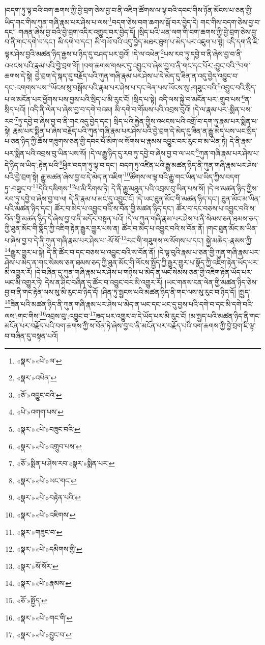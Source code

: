 །བདག་ཏུ་ལྟ་བའི་བག་ཆགས་ཀྱི་བྱེ་བྲག་ཅེས་བྱ་བ་ནི་འཇིག་ཚོགས་ལ་ལྟ་བའི་དབང་གིས་ཉོན་མོངས་པ་ཅན་གྱི་ཡིད་གང་གིས་ཀུན་གཞི་རྣམ་པར་ཤེས་པ་ལས་\footnote{«སྣར་»«པེ་»ལ་}བདག་ཅེས་བག་ཆགས་སྒོ་བར་བྱེད་དེ། གང་གིས་བདག་ཅེས་བྱ་བ་དང་། གཞན་ཞེས་བྱ་བའི་བྱེ་བྲག་འདིར་འགྱུར་བར་བྱེད་དོ། །སྲིད་པའི་ཡན་ལག་གི་བག་ཆགས་ཀྱི་བྱེ་བྲག་ཅེས་བྱ་བ་ནི་གང་དགེ་བ་དང་། མི་དགེ་བ་དང་། མི་གཡོ་བའི་འདུ་བྱེད་མཐར་ཐུག་པ་མེད་པར་འཇུག་པ་སྟེ། འདི་དག་ནི་ཇི་ལྟར་ཤེས་བྱའི་མཚན་ཉིད་རྒྱས་པ་ཉིད་དུ་བཤད་པར་བྱའོ། །དེ་ལ་འཕེན་\footnote{«སྣར་»འཔེན་}པས་རབ་ཏུ་དབྱེ་བ་ནི་ཞེས་བྱ་བ་ནི་འཕངས་པའི་རྣམ་པའི་བྱེ་བྲག་གོ། །བག་ཆགས་གསར་དུ་འབྱུང་བ་ཞེས་བྱ་བ་ནི་གང་དང་པོར་:བྱུང་བའི་\footnote{«ཅོ་»འབྱུང་བའི་}བག་ཆགས་དེ་སྟེ། བྱེ་བྲག་དེ་སྐད་དུ་བརྗོད་པའི་ཀུན་གཞི་རྣམ་པར་ཤེས་པ་དེ་མེད་དུ་ཟིན་ན་འདུ་བྱེད་འབྱུང་བ་དང་:འགགས་པས་\footnote{«པེ་»འགག་པས་}ཡོངས་སུ་བསྒོས་པའི་རྣམ་པར་ཤེས་པ་དང་ལེན་པས་ཡོངས་སུ་:གཟུང་བའི་\footnote{«སྣར་»«པེ་»བཟུང་བའི་}འབྱུང་བའི་སྲིད་པ་ལ་མངོན་པར་ཕྱོགས་པས་བྱས་པའི་སྲིད་པ་མི་རུང་ངོ། །སྲིད་པ་སྟེ། འདི་ལས་སྐྱེ་བ་མངོན་པར་:གྲུབ་པས་\footnote{«སྣར་»«པེ་»འགྲུབ་པས་}ན་སྲིད་པའོ། །འདི་ནི་ལེན་པ་ཞེས་བྱ་བ་དགེ་བའམ། མི་དགེ་བ་གོམས་པའི་འབྲས་བུའོ། །དེ་ལ་རྣམ་པར་:སྨིན་པས་རབ་\footnote{«ཅོ་»སྨིན་པ་ཤེས་རབ་«སྣར་»སྨིན་པར་}ཏུ་དབྱེ་བ་ཞེས་བྱ་བ་ནི་གང་འདུ་བྱེད་དང་། སྲིད་པའི་རྐྱེན་གྱིས་འཕངས་པའི་འགྲོ་བ་དག་ཏུ་རྣམ་པར་སྨིན་པ་སྟེ། རྣམ་པར་སྨིན་པ་ཞེས་བརྗོད་པའི་ཀུན་གཞི་རྣམ་པར་ཤེས་པའི་བྱེ་བྲག་དེ་མེད་དུ་ཟིན་ན་རྒྱུ་མེད་པས་ཡང་སྲིད་པ་ཅན་ཉིད་ཀྱི་ཆོས་གཟུགས་ཅན་གྱི་དབང་པོ་མིག་ལ་སོགས་པ་རྣམས་འབྱུང་བར་རུང་བ་མ་ཡིན་ཏེ། དེ་ནི་རྣམ་པར་སྨིན་པའི་འབྲས་བུ་ཡིན་པས་སོ། །དེ་ལ་རྒྱུ་ཉིད་དུ་རབ་ཏུ་དབྱེ་བ་ཞེས་བྱ་བ་ལ་ཡང་\footnote{«སྣར་»«པེ་»ཡང་གང་}ཀུན་གཞི་རྣམ་པར་ཤེས་པ་དེ་ཉིད་ལ་ཡིད་:རྟེན་པའི་\footnote{«སྣར་»«པེ་»བརྟེན་པའི་}ཕྱིར་བདག་ཏུ་ལྟ་བ་དང་། བདག་ཏུ་འཛིན་པའི་རྒྱུ་མཚན་ཉིད་ནི་ཀུན་གཞི་རྣམ་པར་ཤེས་པའི་བྱེ་བྲག་སྟེ། རྒྱུ་མཚན་ཞེས་བྱ་བ་དེ་མེད་ན་འཇིག་\footnote{«སྣར་»«པེ་»འཇིགས་}ཚོགས་ལ་ལྟ་བའི་རྒྱུ་གང་ཡིན་པ་ཡིད་ཀྱིས་བདག་ཏུ་:བཟུང་བ་\footnote{«སྣར་»གཟུང་བ་}དེའི་དམིགས་\footnote{«སྣར་»«པེ་»དམིགས་གྱི་}པ་མི་རིགས་ཏེ། དེ་ནི་རྒྱུ་མཐུན་པའི་འབྲས་བུ་ཡིན་པས་སོ། །དེ་ལ་མཚན་ཉིད་ཀྱིས་རབ་ཏུ་དབྱེ་བ་ཞེས་བྱ་བ་ལ། དེ་ནི་རྣམ་པ་མང་དུ་འབྱུང་ངོ། །དེ་ཡང་ཐུན་མོང་གི་མཚན་ཉིད་དང་། ཐུན་མོང་མ་ཡིན་པའི་མཚན་ཉིད་དང་། ཚོར་བ་མེད་པ་འབྱུང་བའི་ས་བོན་གྱི་མཚན་ཉིད་དང་། ཚོར་བ་དང་བཅས་པ་འབྱུང་བའི་ས་བོན་གྱི་མཚན་ཉིད་དེ་ཞེས་བྱ་བ་ནི་མདོར་བསྟན་པའོ། །དེ་ལ་ཀུན་གཞི་རྣམ་པར་ཤེས་པ་ནི་སེམས་ཅན་ཐམས་ཅད་ཀྱི་ཐུན་མོང་གི་སྣོད་ཀྱི་འཇིག་རྟེན་རྒྱུར་གྱུར་པས་ན། ཚོར་བ་མེད་པ་འབྱུང་བའི་ས་བོན་ནོ། །གང་ཐུན་མོང་མ་ཡིན་པ་ཞེས་བྱ་བ་དེ་ནི་ཀུན་གཞི་རྣམ་པར་ཤེས་པ་:སོ་སོ་\footnote{«སྣར་»སོ་སོར་}རང་གི་གཟུགས་ལ་སོགས་པ་དང་། སྐྱེ་མཆེད་:རྣམས་ཀྱི་\footnote{«སྣར་»«པེ་»རྣམས་}རྒྱུར་གྱུར་པ་སྟེ། དེ་ནི་ཚོར་བ་དང་བཅས་པ་འབྱུང་བའི་ས་བོན་ནོ། །དེ་ལྟ་བུའི་རྣམ་པ་ཅན་གྱི་ཀུན་གཞི་རྣམ་པར་ཤེས་པ་མེད་ན་གང་སེམས་ཅན་ཐམས་ཅད་ཀྱི་ཐུན་མོང་གི་ལོངས་སྤྱོད་ཀྱི་རྒྱུར་གྱུར་པ་སྣོད་ཀྱི་འཇིག་རྟེན་ཡོད་པར་མི་འགྱུར་རོ། །དེ་བཞིན་དུ་ཀུན་གཞི་རྣམ་པར་ཤེས་པ་གཉིས་པ་མེད་ན་ཡང་སེམས་ཅན་གྱི་འཇིག་རྟེན་ཡོད་པར་ཡང་མི་འགྱུར་ཏེ། དེས་ན་ཤིང་བཞིན་དུ་ཚོར་བ་འབྱུང་བར་མི་འགྱུར་རོ། །ཡང་གནས་ངན་ལེན་གྱི་མཚན་ཉིད་ཅེས་བྱ་བ་ནི་གང་རྟེན་ལས་སུ་མི་རུང་བ་ཉིད་དོ། །ཤིན་ཏུ་སྦྱངས་པའི་མཚན་ཉིད་ནི་གང་ལས་སུ་རུང་བ་ཉིད་དོ། །སྤྱད་\footnote{«ཅོ་»སྤྱོད་}ཟིན་པའི་མཚན་ཉིད་ནི་ཀུན་གཞི་རྣམ་པར་ཤེས་པ་མེད་ན་ཡང་དང་ཡང་དུ་བྱས་པའི་དགེ་བ་དང་མི་དགེ་བའི་ལས་:གང་གིས་\footnote{«སྣར་»«པེ་»གང་གི་}འབྲས་བུ་:འབྱུང་བ་\footnote{«སྣར་»«པེ་»བྱུང་བ་}ཟད་པར་འགྱུར་བ་དེ་ཡོད་པར་མི་རུང་ངོ། །མ་སྤྱད་པའི་མཚན་ཉིད་ནི་གང་མངོན་པར་བརྗོད་པའི་བག་ཆགས་ཀྱི་ས་བོན་ཏེ་ཞེས་བྱ་བ་ནི་མངོན་པར་བརྗོད་པའི་བག་ཆགས་ཀྱི་བྱེ་བྲག་ཇི་ལྟ་བ་བཞིན་དུ་བསྟན་པའོ། 